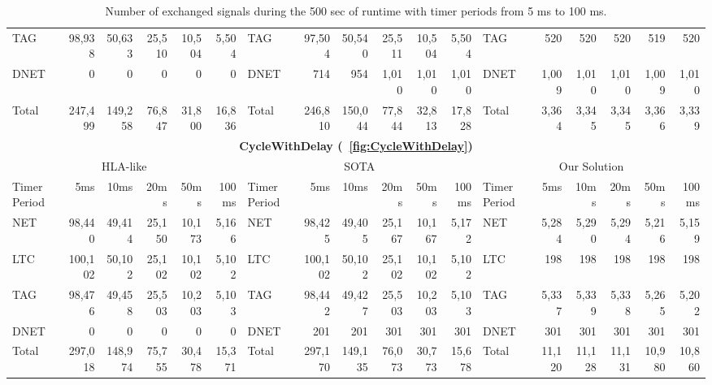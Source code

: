 \begin{table*}
\begin{tabular}{|l|rrrrr||l|rrrrr||l|rrrrr|}
		TAG & 98,938 & 50,633 & 25,510 & 10,504 & 5,504 & TAG & 97,504 & 50,540 & 25,511 & 10,504 & 5,504 & TAG & 520 & 520 & 520 & 519 & 520 \\
		DNET & 0 & 0 & 0 & 0 & 0 & DNET & 714 & 954 & 1,010 & 1,010 & 1,010 & DNET & 1,009 & 1,010 & 1,010 & 1,009 & 1,010 \\
		\hline
		Total & 247,499 & 149,258 & 76,847 & 31,800 & 16,836 & Total & 246,810 & 150,044 & 77,844 & 32,813 & 17,828 & Total & 3,364 & 3,345 & 3,345 & 3,366 & 3,339 \\
		\hline
		\hline
		\multicolumn{18}{|c|}{\textbf{CycleWithDelay (\figurename~\ref{fig:CycleWithDelay})}} \\
		\hline
		\multicolumn{6}{|c||}{HLA-like} & \multicolumn{6}{|c||}{SOTA} & \multicolumn{6}{|c|}{Our Solution} \\
		\hline
		Timer Period \hspace{-5pt} & 5ms & 10ms & 20ms & 50ms & 100ms & Timer Period \hspace{-5pt} & 5ms & 10ms & 20ms & 50ms & 100ms & Timer Period \hspace{-5pt} & 5ms & 10ms & 20ms & 50ms & 100ms \\
		\hline
		NET & 98,440 & 49,414 & 25,150 & 10,173 & 5,166 & NET & 98,425 & 49,405 & 25,167 & 10,167 & 5,172 & NET & 5,284 & 5,290 & 5,294 & 5,216 & 5,159 \\
		LTC & 100,102 & 50,102 & 25,102 & 10,102 & 5,102 & LTC & 100,102 & 50,102 & 25,102 & 10,102 & 5,102 & LTC & 198 & 198 & 198 & 198 & 198 \\
		TAG & 98,476 & 49,458 & 25,503 & 10,203 & 5,103 & TAG & 98,442 & 49,427 & 25,503 & 10,203 & 5,103 & TAG & 5,337 & 5,339 & 5,338 & 5,265 & 5,202 \\
		DNET & 0 & 0 & 0 & 0 & 0 & DNET & 201 & 201 & 301 & 301 & 301 & DNET & 301 & 301 & 301 & 301 & 301 \\
		\hline
		Total & 297,018 & 148,974 & 75,755 & 30,478 & 15,371 & Total & 297,170 & 149,135 & 76,073 & 30,773 & 15,678 & Total & 11,120 & 11,128 & 11,131 & 10,980 & 10,860 \\
		\hline
	\end{tabular}
	
	\caption{Number of exchanged signals during the 500 sec of runtime with timer periods from 5 ms to 100 ms.}
	\label{tab:NumSignals}
\end{table*}